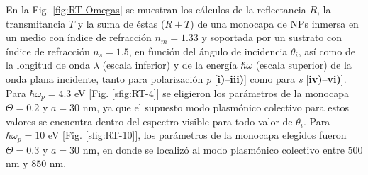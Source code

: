 
En la Fig. \ref{fig:RT-Omegas} se muestran los cálculos de la reflectancia $R$, la transmitancia $T$ y la suma de éstas ($R+T$) de una monocapa de NPs inmersa en un medio con índice de refracción $n_m=1.33$ y soportada por un sustrato con índice de refracción $n_s=1.5$, en función del ángulo de incidencia $\theta_i$, así como de la longitud de onda $\lambda$ (escala inferior) y de la energía  $\hbar\omega$ (escala superior) de la onda plana incidente, tanto para polarización \emph{p}  [\textbf{i)}--\textbf{iii)}] como para \emph{s} [\textbf{iv)}--\textbf{vi)}]. Para $\hbar\omega_p=4.3$ eV [Fig. \ref{sfig:RT-4}] se eligieron los parámetros de la monocapa $\Theta=0.2$ y $a=30$ nm, ya que el supuesto modo plasmónico colectivo para estos valores se encuentra dentro del espectro visible para todo valor de $\theta_i$. Para $\hbar\omega_p=10$ eV [Fig. \ref{sfig:RT-10}], los parámetros de la monocapa elegidos fueron $\Theta=0.3$ y $a=30$ nm, en donde se localizó al modo plasmónico colectivo entre $500$ nm y $850$ nm.

